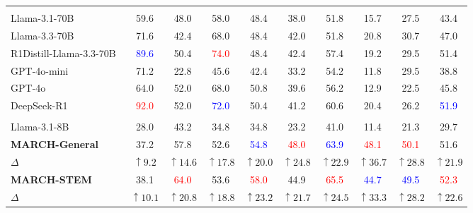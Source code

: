 \documentclass[10pt, a4paper, logo]{googledeepmind} %
\def\rr{\textcolor{red}}
\def\bb{\textcolor{blue}}
\begin{document}
\begin{table}[!h]
{\begin{tabular}{l|ccccccccc}
\midrule
\rowcolor{mygray} \multicolumn{10}{c}{\textit{Instruct + Reasoning Model}}   \\
Llama-3.1-70B~\citep{touvron2023llamaopenefficientfoundation} & 59.6 & 48.0 & 58.0 & 48.4 & 38.0 & 51.8 & 15.7 & 27.5 & 43.4 \\
Llama-3.3-70B~\citep{touvron2023llamaopenefficientfoundation} & 71.6 & 42.4 & 68.0 & 48.4 & 42.0 & 51.8 & 20.8 & 30.7 & 47.0 \\
R1Distill-Llama-3.3-70B~\citep{deepseekai2025deepseekr1incentivizingreasoningcapability} & \bb{89.6} & 50.4 & \rr{74.0} & 48.4 & 42.4 & 57.4 & 19.2 & 29.5 & 51.4 \\
GPT-4o-mini & 71.2 & 22.8 & 45.6 & 42.4 & 33.2 & 54.2 & 11.8 & 29.5 & 38.8 \\
GPT-4o & 64.0 & 52.0 & 68.0 & 50.8 & 39.6 & 56.2 & 12.9 & 22.5 & 45.8 \\
DeepSeek-R1~\citep{deepseekai2025deepseekr1incentivizingreasoningcapability} & \rr{92.0} & 52.0 & \bb{72.0} & 50.4 & 41.2 & 60.6 & 20.4 & 26.2 & \bb{51.9} \\
\midrule
\rowcolor{mygray} \multicolumn{10}{c}{\textit{OURS}}   \\
Llama-3.1-8B & 28.0 & 43.2 & 34.8 & 34.8 & 23.2 & 41.0 & 11.4 & 21.3 & 29.7 \\
\rowcolor{blue!5}\textbf{MARCH-General}       & 37.2 & 57.8 & 52.6 & \bb{54.8} & \rr{48.0} & \bb{63.9} & \rr{48.1} & \rr{50.1} & {51.6} \\
\rowcolor{blue!5}$\Delta$ & \textcolor{ggg}{$\uparrow9.2$} & \textcolor{ggg}{$\uparrow14.6$} & \textcolor{ggg}{$\uparrow17.8$} & \textcolor{ggg}{$\uparrow20.0$} & \textcolor{ggg}{$\uparrow24.8$} & \textcolor{ggg}{$\uparrow22.9$} & \textcolor{ggg}{$\uparrow36.7$} & \textcolor{ggg}{$\uparrow28.8$} & \textcolor{ggg}{$\uparrow21.9$} \\ 
\rowcolor{blue!5}\textbf{MARCH-STEM}      & 38.1 & \rr{64.0} & 53.6 & \rr{58.0} & 44.9 & \rr{65.5} & \bb{44.7} & \bb{49.5} & \rr{52.3} \\
\rowcolor{blue!5}$\Delta$ & \textcolor{ggg}{$\uparrow10.1$} & \textcolor{ggg}{$\uparrow20.8$} & \textcolor{ggg}{$\uparrow18.8$} & \textcolor{ggg}{$\uparrow23.2$} & \textcolor{ggg}{$\uparrow21.7$} & \textcolor{ggg}{$\uparrow24.5$} & \textcolor{ggg}{$\uparrow33.3$} & \textcolor{ggg}{$\uparrow28.2$} & \textcolor{ggg}{$\uparrow22.6$} \\ 
\bottomrule
\end{tabular}
} \label{tab:comp_main_res_cjb}
\end{table}
\end{document}

